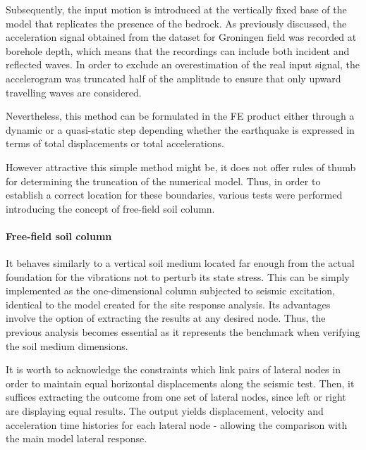 	Subsequently, the input motion is introduced at the vertically fixed base of the model that replicates the presence of the bedrock. As previously discussed, the acceleration signal obtained from the dataset for Groningen field was recorded at borehole depth, which means that the recordings can include both incident and reflected waves. In order to exclude an overestimation of the real input signal, the accelerogram was truncated half of the amplitude to ensure that only upward travelling waves are considered.
	
	Nevertheless, this method can be formulated in the FE product either through a dynamic or a quasi-static step depending whether the earthquake is expressed in terms of total displacements or total accelerations.
	
	However attractive this simple method might be, it does not offer rules of thumb for determining the truncation of the numerical model. Thus, in order to establish a correct location for these boundaries, various tests were performed introducing the concept of free-field soil column.
	
	\paragraph{Free-field soil column}
	It behaves similarly to a vertical soil medium located far enough from the actual foundation for the vibrations not to perturb its state stress. This can be simply implemented as the one-dimensional column subjected to seismic excitation, identical to the model created for the site response analysis. Its advantages involve the option of extracting the results at any desired node. Thus, the previous analysis becomes essential as it represents the benchmark when verifying the soil medium dimensions.
		
	It is worth to acknowledge the constraints which link pairs of lateral nodes in order to maintain equal horizontal displacements along the seismic test. Then, it suffices extracting the outcome from one set of lateral nodes, since left or right are displaying equal results. The output yields displacement, velocity and acceleration time histories for each lateral node - allowing the comparison with the main model lateral response.
			
